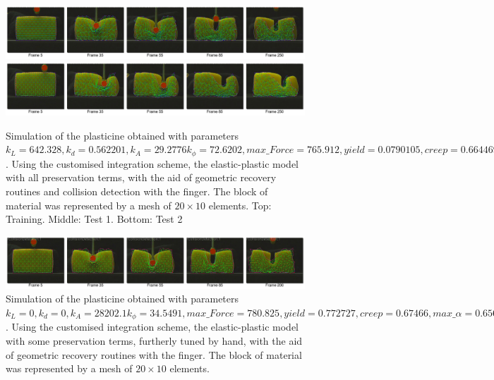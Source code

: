 \documentclass[journal]{IEEEtran}
\begin{document}
\begin{figure}[!t]
\centering
\includegraphics[width=178mm]{arrio12}
\includegraphics[width=178mm]{arrio13}
\caption{Simulation of the plasticine obtained with parameters $k_L=642.328, k_d=0.562201, k_A=29.2776 k_{\phi}=72.6202, max\_Force=765.912, yield=0.0790105, creep=0.664469, max\_\alpha=0.48842$.  Using the customised integration scheme, the elastic-plastic model with all preservation terms, with the aid of geometric recovery routines and collision detection with the finger.  The block of material was represented by a mesh of $20 \times 10$ elements. Top: Training. Middle: Test 1. Bottom: Test 2}\label{fig:simulation_plasticine}
\end{figure}

\begin{figure}[!t]
\centering
\includegraphics[width=178mm]{arrio16}
\caption{Simulation of the plasticine obtained with parameters $k_L=0, k_d=0, k_A=28202.1 k_{\phi}=34.5491, max\_Force=780.825, yield=0.772727, creep=0.67466, max\_\alpha=0.656572$.  Using the customised integration scheme, the elastic-plastic model with some preservation terms, furtherly tuned by hand,  with the aid of geometric recovery routines with the finger.  The block of material was represented by a mesh of $20 \times 10$ elements.}\label{fig:simulation_plasticine_hand}
\end{figure}
\end{document}
